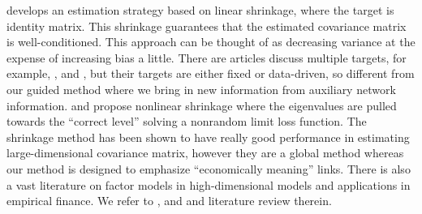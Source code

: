     \cite{ledoit2004HoneyShrunk} develops an estimation strategy based on linear shrinkage, where the target is identity matrix. This shrinkage guarantees that the estimated covariance matrix is well-conditioned. This approach can be thought of as decreasing variance at the expense of increasing bias a little. There are articles discuss multiple targets, for example, \cite{schafer2005ShrinkageApproach}, \cite{lancewicki2014MultiTargetShrinkage} and \cite{gray2018ShrinkageEstimation}, but their targets are either fixed or data-driven, so different from our guided method where we bring in new information from auxiliary network information. 
    \cite{ledoit2012NonlinearShrinkage} and \cite{ledoit2017NonlinearShrinkage} propose nonlinear shrinkage where the eigenvalues are pulled towards the ``correct level'' solving a nonrandom limit loss function. The shrinkage method has been shown to have really good performance in estimating large-dimensional covariance matrix, however they are a global method whereas our method is designed to emphasize ``economically meaning'' links. There is also a vast literature on factor models in high-dimensional models and applications in empirical finance. We refer to \cite{connor2012EfficientSemiparametric}, \cite{fan2015OverviewEstimation} and \cite{fan2016ProjectedPrincipal} and literature review therein. 